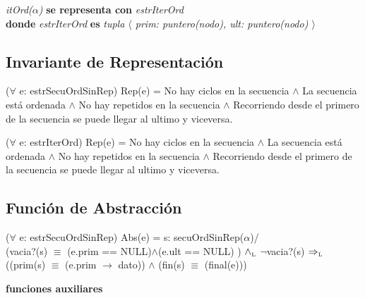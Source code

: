 \textit{itOrd($\alpha$)} \textbf{se representa con} \textit{estrIterOrd}\\
\textbf{donde} \textit{estrIterOrd} \textbf{es} \textit{tupla $\langle$ prim: puntero(nodo), ult: puntero(nodo) $\rangle$}\\

\subsection*{Invariante de Representaci\'on}
\vspace{11pt}
($\forall$ e: estrSecuOrdSinRep) Rep(e) = No hay ciclos en la secuencia $\wedge$ La secuencia est\'a ordenada $\wedge$ No hay repetidos en la secuencia $\wedge$ Recorriendo desde el primero de la secuencia se puede llegar al ultimo y viceversa.

\vspace{22pt}

\vspace{11pt}
($\forall$ e: estrIterOrd) Rep(e) = No hay ciclos en la secuencia $\wedge$ La secuencia est\'a ordenada $\wedge$ No hay repetidos en la secuencia $\wedge$ Recorriendo desde el primero de la secuencia se puede llegar al ultimo y viceversa.

\vspace{33pt}

\subsection*{Funci\'on de Abstracci\'on}
\vspace{11pt}
($\forall$ e: estrSecuOrdSinRep) Abs(e) = s: secuOrdSinRep($\alpha$)/\\
(vacia?(s) $\equiv$ (e.prim == NULL)$\wedge$(e.ult == NULL) ) $\land_{\mathrm{\scriptscriptstyle{L}}}$ $\neg$vacia?(s) $\Rightarrow_{\mathrm{\scriptscriptstyle{L}}}$ ((prim(s) $\equiv$ (e.prim $\rightarrow$ dato)) $\wedge$ (fin(s) $\equiv$ (final(e))) 
\vspace{22pt}

\textbf{funciones auxiliares}

\vspace{22pt}

